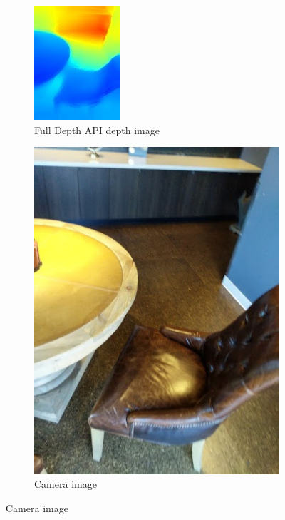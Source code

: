 \begin{figure}[ht!]
    \centering
    \begin{subfigure}[b]{0.4\textwidth}
        \centering
        \includegraphics[width=0.8\linewidth]{images/depth_full-depth-image}
        \caption{Full Depth API depth image}
    \end{subfigure}%
    \begin{subfigure}[b]{0.4\textwidth}
        \centering
        \includegraphics[width=0.8\linewidth]{images/depth_camera-image}
        \caption{Camera image}
    \end{subfigure}%


\end{figure}
